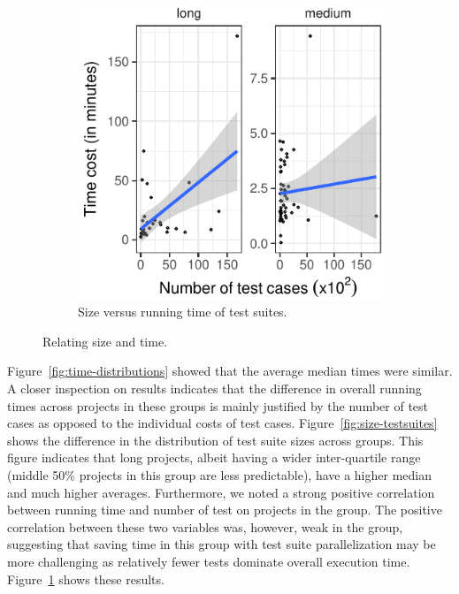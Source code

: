 \begin{figure}[t]
\begin{subfigure}{0.3\textwidth}
    \includegraphics[width=.95\textwidth]{plots/scatter-testcost.pdf}
    \caption{\label{fig:scattercost}Size versus running time of
      test suites.}
  \end{subfigure}
  \caption{\label{fig:time-versus-size}Relating size and time.}%
\end{figure}


Figure~\ref{fig:time-distributions} showed that the average median
times were similar.  A closer inspection on results indicates that the
difference in overall running times across projects in these groups is
mainly justified by the number of test cases as opposed to the
individual costs of test cases.  Figure~\ref{fig:size-testsuites}
shows the difference in the distribution of test suite sizes across
groups.  This figure indicates that long projects, albeit having a
wider inter-quartile range (middle 50\% projects in this group are
less predictable), have a higher median and much higher averages.
Furthermore, we noted a strong positive correlation between running
time and number of test on projects in the \longg{} group.  The
positive correlation between these two variables was, however, weak in
the \medg{} group, suggesting that saving time in this group with test
suite parallelization may be more challenging as relatively fewer
tests dominate overall execution time.  Figure~\ref{fig:scattercost}
shows these results.

